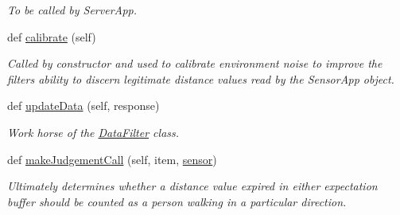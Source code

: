 \begin{DoxyCompactItemize}
\begin{DoxyCompactList}\small\item\em To be called by Server\+App. \end{DoxyCompactList}\item 
def \mbox{\hyperlink{class_data_filter_1_1_data_filter_a3e2775cb10b099daeb8a7bcf9aa5fe9f}{calibrate}} (self)
\begin{DoxyCompactList}\small\item\em Called by constructor and used to calibrate environment noise to improve the filter\textquotesingle{}s ability to discern legitimate distance values read by the Sensor\+App object. \end{DoxyCompactList}\item 
def \mbox{\hyperlink{class_data_filter_1_1_data_filter_a494edf5de2ab50286063711a120d05ef}{update\+Data}} (self, response)
\begin{DoxyCompactList}\small\item\em Work horse of the \mbox{\hyperlink{class_data_filter_1_1_data_filter}{Data\+Filter}} class. \end{DoxyCompactList}\item 
def \mbox{\hyperlink{class_data_filter_1_1_data_filter_afed5beb108e5fc193a7d8de6b183c047}{make\+Judgement\+Call}} (self, item, \mbox{\hyperlink{class_data_filter_1_1_data_filter_a2f9315bfe6ab0a7b74bcb98310b2f8d2}{sensor}})
\begin{DoxyCompactList}\small\item\em Ultimately determines whether a distance value expired in either expectation buffer should be counted as a person walking in a particular direction. \end{DoxyCompactList}\end{DoxyCompactItemize}
